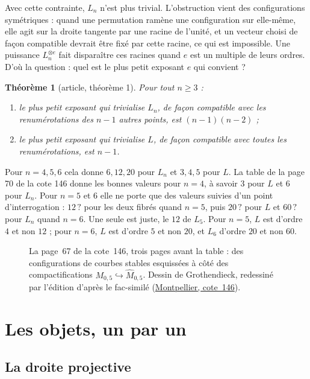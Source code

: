 \documentclass[11pt,a4paper]{amsart}
\theoremstyle{definition}
\theoremstyle{plain}
\newtheorem{theoreme}{Théorème}
\theoremstyle{remark}
\begin{document}
Avec cette contrainte, $L_n$ n'est plus trivial. L'obstruction vient des configurations symétriques : quand une permutation ramène une configuration sur elle-même, elle agit sur la droite tangente par une racine de l'unité, et un vecteur choisi de façon compatible devrait être fixé par cette racine, ce qui est impossible. Une puissance $L_n^{\otimes e}$ fait disparaître ces racines quand $e$ est un multiple de leurs ordres. D'où la question : quel est le plus petit exposant $e$ qui convient ?

\begin{theoreme}[article, théorème 1]
Pour tout $n \ge 3$ :
\begin{enumerate}
\item le plus petit exposant qui trivialise $L_n$, de façon compatible avec les renumérotations des $n-1$ autres points, est $(n-1)(n-2)$ ;
\item le plus petit exposant qui trivialise $L$, de façon compatible avec toutes les renumérotations, est $n-1$.
\end{enumerate}
\end{theoreme}

Pour $n = 4, 5, 6$ cela donne $6, 12, 20$ pour $L_n$ et $3, 4, 5$ pour $L$. La table de la page 70 de la cote 146 donne les bonnes valeurs pour $n = 4$, à savoir $3$ pour $L$ et $6$ pour $L_n$. Pour $n = 5$ et $6$ elle ne porte que des valeurs suivies d'un point d'interrogation : $12\,?$ pour les deux fibrés quand $n = 5$, puis $20\,?$ pour $L$ et $60\,?$ pour $L_n$ quand $n = 6$. Une seule est juste, le $12$ de $L_5$. Pour $n = 5$, $L$ est d'ordre $4$ et non $12$ ; pour $n = 6$, $L$ est d'ordre $5$ et non $20$, et $L_6$ d'ordre $20$ et non $60$.

\begin{figure}[htbp]
\centering
\resizebox{0.7\linewidth}{!}{}
\caption{La page~67 de la cote~146, trois pages avant la table : des configurations de courbes stables esquissées à côté des compactifications $M_{0,5} \hookrightarrow \hat M_{0,5}$. Dessin de Grothendieck, redessiné par l'édition d'après le fac-similé (\href{https://grothendieck.umontpellier.fr/146.pdf}{Montpellier, cote~146}).}\label{fig:p67}
\end{figure}

\section{Les objets, un par un}

\subsection{La droite projective}
\end{document}
